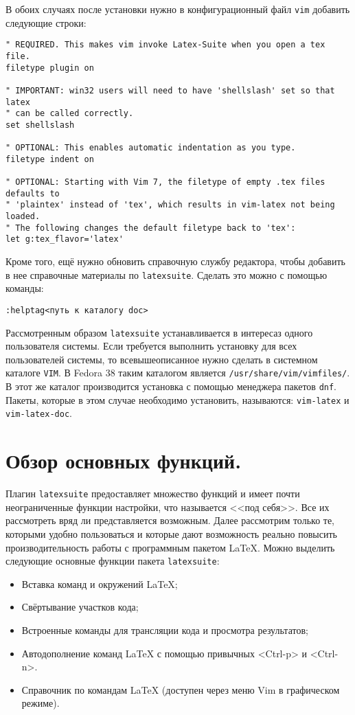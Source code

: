 \documentclass[a4paper]{article}
\begin{document}
В обоих случаях после установки нужно в 
конфигурационный файл \texttt{vim} добавить следующие строки:
\begin{verbatim}
" REQUIRED. This makes vim invoke Latex-Suite when you open a tex file.
filetype plugin on

" IMPORTANT: win32 users will need to have 'shellslash' set so that latex
" can be called correctly.
set shellslash

" OPTIONAL: This enables automatic indentation as you type.
filetype indent on

" OPTIONAL: Starting with Vim 7, the filetype of empty .tex files defaults to
" 'plaintex' instead of 'tex', which results in vim-latex not being loaded.
" The following changes the default filetype back to 'tex':
let g:tex_flavor='latex'
\end{verbatim}

Кроме того, ещё нужно обновить справочную службу редактора, чтобы добавить
в нее справочные материалы по \texttt{latexsuite}. Сделать это можно с помощью
команды:
\begin{verbatim}
:helptag<путь к каталогу doc>
\end{verbatim}

Рассмотренным образом \texttt{latexsuite} устанавливается в интересаз одного пользователя системы.
Если требуется выполнить установку для всех пользователей системы, то всевышеописанное нужно 
сделать в системном каталоге \texttt{VIM}. В Fedora 38 таким каталогом является
\texttt{/usr/share/vim/vimfiles/}. В этот же каталог производится установка с помощью менеджера
пакетов \texttt{dnf}. Пакеты, которые в этом случае необходимо установить, называются: 
\texttt{vim-latex} и \texttt{vim-latex-doc}.
\part{Обзор основных функций.}\label{part:main-functions}
Плагин \texttt{latexsuite} предоставляет множество функций и имеет почти
неограниченные функции настройки, что называется <<под себя>>. Все их
рассмотреть вряд ли представляется возможным. Далее рассмотрим только те,
которыми удобно пользоваться и которые дают возможность реально 
повысить производительность работы с программным пакетом \LaTeX.
Можно выделить следующие основные функции пакета \texttt{latexsuite}:
\begin{itemize}
	\item Вставка команд и окружений \LaTeX;
	\item Свёртывание участков кода;
	\item Встроенные команды для трансляции кода и просмотра результатов;
	\item Автодополнение команд \LaTeX{} с помощью привычных <Ctrl-p> и <Ctrl-n>.
	\item Справочник по командам \LaTeX{} (доступен через меню Vim в графическом режиме).
\end{itemize}
\end{document}
